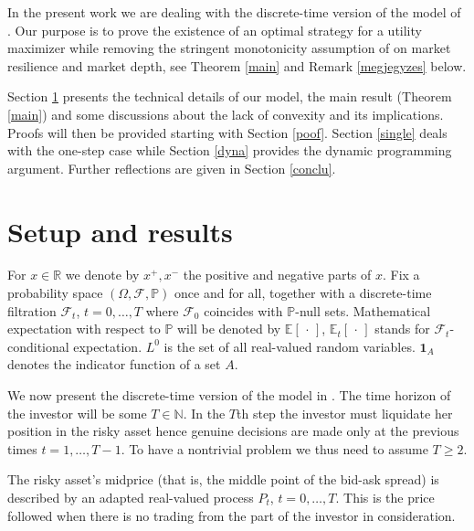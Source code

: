 \documentclass[a4paper]{article}
\begin{document}
In the present work we are dealing with the discrete-time version of the model of
\cite{peter-yan}. Our purpose is to prove the existence of an optimal strategy for
a utility maximizer while removing the stringent monotonicity assumption of \cite{peter-yan}
on market resilience and market depth, see Theorem \ref{main} and Remark \ref{megjegyzes} below. 

Section \ref{setup} presents the technical details of our model, the main result (Theorem \ref{main}) and some discussions
about the lack of convexity and its implications. Proofs will 
then be provided starting with Section \ref{poof}. Section \ref{single} deals with the one-step case while Section \ref{dyna} 
provides the dynamic programming argument. 
Further reflections are given in Section \ref{conclu}.

\section{Setup and results}\label{setup}

For $x\in\mathbb{R}$ we denote by $x^{+},x^{-}$ the positive and negative parts of $x$.
Fix a probability space $(\Omega,\mathcal{F},\mathbb{P})$ once and for all, together with a discrete-time
filtration $\mathcal{F}_{t}$, $t=0,\ldots,T$ where $\mathcal{F}_{0}$ coincides with $\mathbb{P}$-null sets. 
Mathematical expectation with respect to $\mathbb{P}$ will be denoted by $\mathbb{E}[\,\cdot\,]$,{}
$\mathbb{E}_{t}[\, \cdot\,]$ stands for $\mathcal{F}_{t}$-conditional expectation. $L^{0}$ is the set of all
real-valued random variables. $\mathbf{1}_{A}$ denotes the indicator function of a set $A$.

We now present the discrete-time version of the model in \cite{peter-yan}.
The time horizon of the investor will be some $T\in\mathbb{N}$. In the $T$th step the investor
must liquidate her position in the risky asset hence genuine decisions are made only at 
the previous times $t=1,\ldots, T-1$. To have a nontrivial problem we thus need to assume $T\geq 2$.

The risky asset's midprice (that is, the middle point of the bid-ask spread)
is described by an adapted real-valued process $P_{t}$, $t=0,\ldots,T$.{}
This is the price followed when there is no trading from the part of the investor in consideration.
\end{document}
